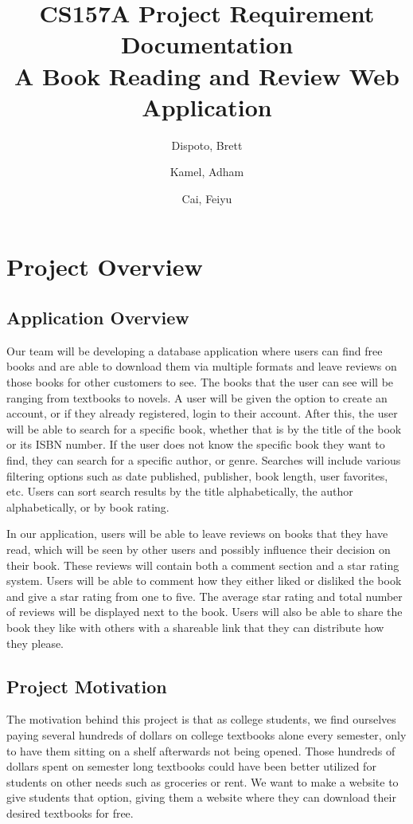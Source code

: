 \documentclass[letter, 12pt, titlepage]{article}
\author{ Dispoto, Brett\\
        \and
        Kamel, Adham\\
        \and
        Cai, Feiyu\\
}
\title{CS157A Project Requirement Documentation \\
        \large A Book Reading and Review Web Application}
\begin{document}
  \maketitle
        \section{Project Overview}
        \subsection{Application Overview}
        Our team will be developing a database application where users can find free books and are able to download them via multiple formats and leave reviews on those books for other customers to see. The books that the user can see will be ranging from textbooks to novels. A user will be given the option to create an account, or if they already registered, login to their account. After this, the user will be able to search for a specific book, whether that is by the title of the book or its ISBN number. If the user does not know the specific book they want to find, they can search for a specific author, or genre. Searches will include various filtering options such as date published, publisher, book length, user favorites, etc. Users can sort search results by the title alphabetically, the author alphabetically, or by book rating.

\medskip
        In our application, users will be able to leave reviews on books that they have read, which will be seen by other users and possibly influence their decision on their book. These reviews will contain both a comment section and a star rating system. Users will be able to comment how they either liked or disliked the book and give a star rating from one to five. The average star rating and total number of reviews will be displayed next to the book. Users will also be able to share the book they like with others with a shareable link that they can distribute how they please.
	\subsection{Project Motivation}
	The motivation behind this project is that as college students, we find ourselves paying several hundreds of dollars on college textbooks alone every semester, only to have them sitting on a shelf afterwards not being opened. Those hundreds of dollars spent on semester long textbooks could have been better utilized for students on other needs such as groceries or rent. We want to make a website to give students that option, giving them a website where they can download their desired textbooks for free.
\end{document}
